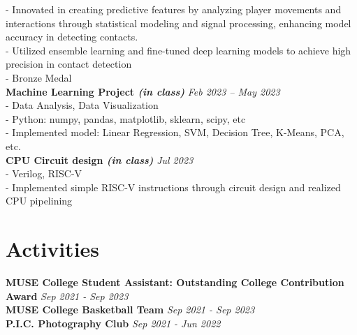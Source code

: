 \documentclass[a4paper,10pt]{article}
\begin{document}
- Innovated in creating predictive features by analyzing player movements and interactions through statistical modeling and signal processing, enhancing model accuracy in detecting contacts.\\
- Utilized ensemble learning and fine-tuned deep learning models to achieve high precision in contact detection\\
- Bronze Medal\\
\textbf{Machine Learning Project \textit{(in class)}} \hfill \textit{Feb 2023 -- May 2023}\\
- Data Analysis, Data Visualization\\
- Python: numpy, pandas, matplotlib, sklearn, scipy, etc\\
- Implemented model: Linear Regression, SVM, Decision Tree, K-Means, PCA, etc.\\
\textbf{CPU Circuit design \textit{(in class)}} \hfill \textit{Jul 2023}\\
- Verilog, RISC-V\\
- Implemented simple RISC-V instructions through circuit design and realized CPU pipelining

\section*{Activities}
\textbf{MUSE College Student Assistant: Outstanding College Contribution Award} \hfill \textit{Sep 2021 - Sep 2023}\\
\textbf{MUSE College Basketball Team} \hfill \textit{Sep 2021 - Sep 2023}\\
\textbf{P.I.C. Photography Club} \hfill \textit{Sep 2021 - Jun 2022}
\end{document}
